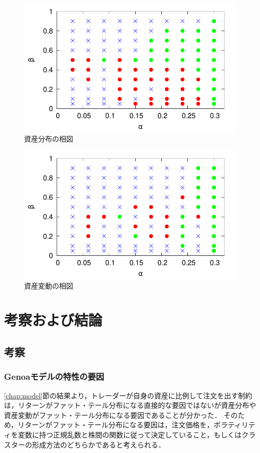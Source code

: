 \documentclass[titlepage]{jsreport}
\begin{document}
\begin{figure}
    \centering
    \includegraphics[width=0.9\linewidth]{fig/signal.pdf}
    \caption{資産分布の相図}
    \label{fig:signal_asset}
\end{figure}

\begin{figure}
    \centering
    \includegraphics[width=0.9\linewidth]{fig/signal/signal_asset_growth.pdf}
    \caption{資産変動の相図}
    \label{fig:signal_asset_growth}
\end{figure}


\chapter{考察および結論} \label{chap:summary}
\section{考察}
\subsection{Genoaモデルの特性の要因}
\ref{chap:model}節の結果より，トレーダーが自身の資産に比例して注文を出す制約は，リターンがファット・テール分布になる直接的な要因ではないが資産分布や資産変動がファット・テール分布になる要因であることが分かった．
そのため，リターンがファット・テール分布になる要因は，注文価格を，ボラティリティを変数に持つ正規乱数と株間の関数に従って決定していること，もしくはクラスターの形成方法のどちらかであると考えられる．
\end{document}
